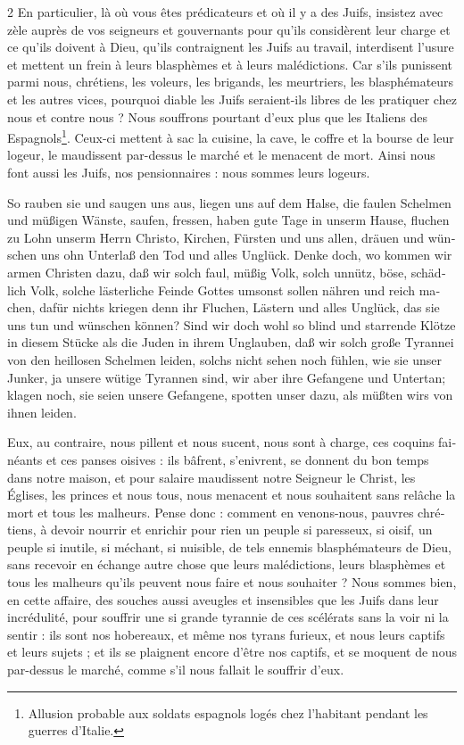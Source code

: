 \documentclass[a4paper,12pt]{article}
\newcommand\chunks[2]{%
\begin{leftcolumn*}\begin{otherlanguage}{german}%
{#1}%
\end{otherlanguage}\end{leftcolumn*}%
\begin{rightcolumn}\begin{otherlanguage}{french}%
{#2}%
\end{otherlanguage}\end{rightcolumn}%
}
\begin{document}
\begin{paracol}{2}
         {En particulier, là où vous êtes prédicateurs et où il y a des Juifs, insistez avec zèle auprès de vos seigneurs et gouvernants pour qu’ils considèrent leur charge et ce qu’ils doivent à Dieu, qu’ils contraignent les Juifs au travail, interdisent l’usure et mettent un frein à leurs blasphèmes et à leurs malédictions. Car s’ils punissent parmi nous, chrétiens, les voleurs, les brigands, les meurtriers, les blasphémateurs et les autres vices, pourquoi diable les Juifs seraient-ils libres de les pratiquer chez nous et contre nous ? Nous souffrons pourtant d’eux plus que les Italiens des Espagnols\footnote{Allusion probable aux soldats espagnols logés chez l’habitant pendant les guerres d’Italie.}. Ceux-ci mettent à sac la cuisine, la cave, le coffre et la bourse de leur logeur, le maudissent par-dessus le marché et le menacent de mort. Ainsi nous font aussi les Juifs, nos pensionnaires : nous sommes leurs logeurs.}
  \chunks{So rauben sie und saugen uns aus, liegen uns auf dem Halse, die faulen Schelmen und müßigen Wänste, saufen, fressen, haben gute Tage in unserm Hause, fluchen zu Lohn unserm Herrn Christo, Kirchen, Fürsten und uns allen, dräuen und wünschen uns ohn Unterlaß den Tod und alles Unglück. Denke doch, wo kommen wir armen Christen dazu, daß wir solch faul, müßig Volk, solch unnütz, böse, schädlich Volk, solche lästerliche Feinde Gottes umsonst sollen nähren und reich machen, dafür nichts kriegen denn ihr Fluchen, Lästern und alles Unglück, das sie uns tun und wünschen können? Sind wir doch wohl so blind und starrende Klötze in diesem Stücke als die Juden in ihrem Unglauben, daß wir solch große Tyrannei von den heillosen Schelmen leiden, solchs nicht sehen noch fühlen, wie sie unser Junker, ja unsere wütige Tyrannen sind, wir aber ihre Gefangene und Untertan; klagen noch, sie seien unsere Gefangene, spotten unser dazu, als müßten wirs von ihnen leiden.}
         {Eux, au contraire, nous pillent et nous sucent, nous sont à charge, ces coquins fainéants et ces panses oisives : ils bâfrent, s’enivrent, se donnent du bon temps dans notre maison, et pour salaire maudissent notre Seigneur le Christ, les Églises, les princes et nous tous, nous menacent et nous souhaitent sans relâche la mort et tous les malheurs. Pense donc : comment en venons-nous, pauvres chrétiens, à devoir nourrir et enrichir pour rien un peuple si paresseux, si oisif, un peuple si inutile, si méchant, si nuisible, de tels ennemis blasphémateurs de Dieu, sans recevoir en échange autre chose que leurs malédictions, leurs blasphèmes et tous les malheurs qu’ils peuvent nous faire et nous souhaiter ? Nous sommes bien, en cette affaire, des souches aussi aveugles et insensibles que les Juifs dans leur incrédulité, pour souffrir une si grande tyrannie de ces scélérats sans la voir ni la sentir : ils sont nos hobereaux, et même nos tyrans furieux, et nous leurs captifs et leurs sujets ; et ils se plaignent encore d’être nos captifs, et se moquent de nous par-dessus le marché, comme s’il nous fallait le souffrir d’eux.}

\end{paracol}
\end{document}
